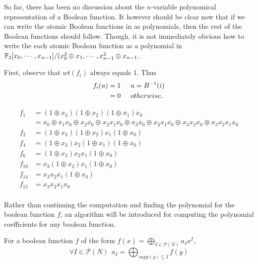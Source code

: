 \par So far, there has been no discussion about the $n$-variable polynomical
representation of a Boolean function. It however should be clear now that
if we can write the atomic Boolean functions in as polynomials, then the
rest of the Boolean functions should follow. Though, it is not immediately
obvious how to write the each atomic Boolean function as a polynomial in
$\mathbb{F}_2[x_0,\cdots,x_{n-1}]/\allowbreak(x_0^2\oplus\allowbreak x_1,\cdots,x_{n-1}^2\oplus\allowbreak x_{n-1}$.

\par First, observe that $wt(f_i)$ always equals 1. Thus
\begin{align*}
	f_i(u)&=1\hspace{5mm}u=B^{-1}(i) \\
			  &=0\hspace{5mm}otherwise. 
\end{align*}



\begin{align*}
  f_1   &=(1\oplus x_3)(1\oplus x_2)(1\oplus x_1)x_0\\
        &=x_0 \oplus x_1x_0 \oplus x_2x_0 \oplus x_2x_1x_0 \oplus x_3x_0 \oplus x_3x_1x_0
        \oplus x_3x_2x_0 \oplus x_3x_2x_1x_0\\
  f_2   &=(1\oplus x_3)(1\oplus x_2)x_1(1\oplus x_0)\\
  f_4   &=(1\oplus x_3)x_2(1\oplus x_1)(1\oplus x_0)\\
  f_6   &=(1\oplus x_3)x_2x_1(1\oplus x_0)\\
  f_{10}&=x_3(1\oplus x_2)x_1(1\oplus x_0)\\
  f_{14}&=x_3x_2x_1(1\oplus x_0)\\
  f_{15}&=x_3x_2x_1x_0\\
\end{align*}

\par Rather than continuing the computation and finding the polynomial for the boolean function
$f$, an algorithm will be introduced for computing the polynomial coefficients for any boolean
function.

\begin{theorem}
  For a boolean function $f$ of the form $f(x)=\bigoplus_{I\in\mathcal{P}(N)}a_Ix^I$, 
  \begin{equation}
    \forall I \in \mathcal{P}(N) \ \ a_I=\bigoplus_{supp(y)\subseteq I}f(y)
  \end{equation}
\end{theorem}


